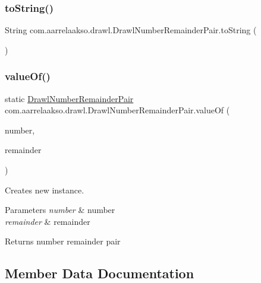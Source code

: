 \subsubsection{\texorpdfstring{to\+String()}{toString()}}
{\footnotesize\ttfamily String com.\+aarrelaakso.\+drawl.\+Drawl\+Number\+Remainder\+Pair.\+to\+String (\begin{DoxyParamCaption}{ }\end{DoxyParamCaption})}

\mbox{\label{classcom_1_1aarrelaakso_1_1drawl_1_1_drawl_number_remainder_pair_af5db5411a5733a9e2c98aa1e8e88765f}} 
\subsubsection{\texorpdfstring{value\+Of()}{valueOf()}}
{\footnotesize\ttfamily static \hyperlink{classcom_1_1aarrelaakso_1_1drawl_1_1_drawl_number_remainder_pair}{Drawl\+Number\+Remainder\+Pair} com.\+aarrelaakso.\+drawl.\+Drawl\+Number\+Remainder\+Pair.\+value\+Of (\begin{DoxyParamCaption}\item[{final \hyperlink{classcom_1_1aarrelaakso_1_1drawl_1_1_drawl_number}{Drawl\+Number}}]{number,  }\item[{final \hyperlink{classcom_1_1aarrelaakso_1_1drawl_1_1_drawl_number}{Drawl\+Number}}]{remainder }\end{DoxyParamCaption})\hspace{0.3cm}{\ttfamily [static]}}



Creates new instance. 


\begin{DoxyParams}{Parameters}
{\em number} & number \\
\hline
{\em remainder} & remainder \\
\hline
\end{DoxyParams}
\begin{DoxyReturn}{Returns}
number remainder pair 
\end{DoxyReturn}


\subsection{Member Data Documentation}
\mbox{\label{classcom_1_1aarrelaakso_1_1drawl_1_1_drawl_number_remainder_pair_a8c62602c155e6b1fe737605fe7229b36}} 
